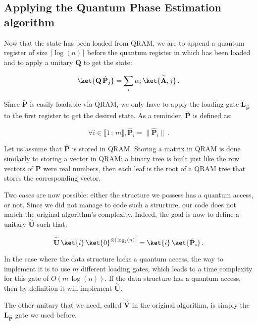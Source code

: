 \documentclass[11pt, a4paper]{article}
\begin{document}
        \subsection{Applying the Quantum Phase Estimation algorithm}
            \label{subsec:ImplementingQPE}
            Now that the state  has been loaded from QRAM, we are to append a quantum register of size \(\lceil\log(n)\rceil\) before the quantum register in which  has been loaded and to apply a unitary \(\mathbf{Q}\) to get the state:
            
            \[\ket{\mathbf{Q}\,\hat{\mathbf{P}}_j}=\sum_i\alpha_i\,\ket{\overset{\sim}{\mathbf{A}}, j}\,.\]
            
            Since \(\overset{\sim}{\mathbf{P}}\) is easily loadable via QRAM, we only have to apply the loading gate \(\mathbf{L}_{\overset{\sim}{\mathbf{P}}}\) to the first register to get the desired state. As a reminder, \(\overset{\sim}{\mathbf{P}}\) is defined as:
            
            \[\forall i\in\llbracket1\,;\,m\rrbracket,\overset{\sim}{\mathbf{P}}_i=\|\hat{\mathbf{P}}_i\|\,.\]
            
            Let us assume that \(\hat{\mathbf{P}}\) is stored in QRAM. Storing a matrix in QRAM is done similarly to storing a vector in QRAM: a binary tree is built just like the row vectors of \(\hat{\mathbf{P}}\) were real numbers, then each leaf is the root of a QRAM tree that stores the corresponding vector.
            
            Two cases are now possible: either the structure we possess has a quantum access, or not. Since we did not manage to code such a structure, our code does not match the original algorithm's complexity. Indeed, the goal is now to define a unitary \(\overset{\sim}{\mathbf{U}}\) such that:
            
            \[\overset{\sim}{\mathbf{U}}\,\ket{i}\,\ket{0}^{\otimes\left\lceil\log_2(n)\right\rceil}=\ket{i}\,\ket{\hat{\mathbf{P}}_i}\,.\]
            
            In the case where the data structure lacks a quantum access, the way to implement it is to use \(m\) different loading gates, which leads to a time complexity for this gate of \(O(m\,\log(n))\). If the data structure has a quantum access, then by definition it will implement \(\overset{\sim}{\mathbf{U}}\).
            
            The other unitary that we need, called \(\overset{\sim}{\mathbf{V}}\) in the original algorithm, is simply the \(\mathbf{L}_{\overset{\sim}{\mathbf{P}}}\) gate we used before.
            
\end{document}
